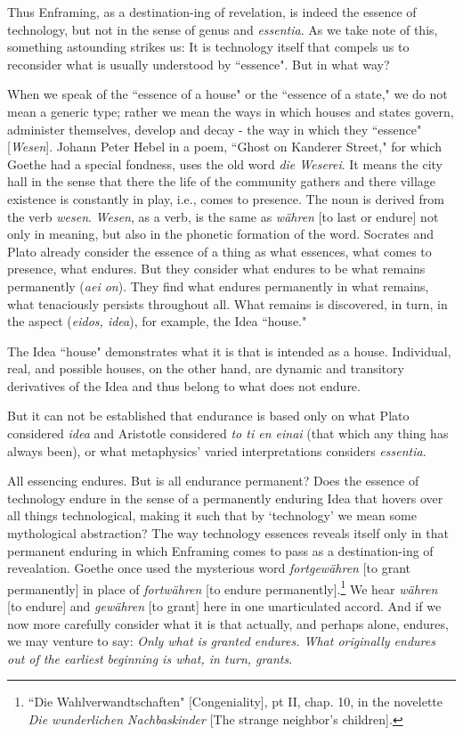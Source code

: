 \documentclass[paper=a4, fontsize=11pt,twoside]{scrartcl}
\begin{document}
Thus Enframing, as a destination-ing of revelation, is indeed the essence of technology, but not in the sense of genus and \textit{essentia}. As we take note of this, something astounding strikes us: It is technology itself that compels us to reconsider what is usually understood by ``essence". But in what way?

When we speak of the ``essence of a house" or the ``essence of a state," we do not mean a generic type; rather we mean the ways in which houses and states govern, administer themselves, develop and decay - the way in which they ``essence" [\textit{Wesen}]. Johann Peter Hebel in a poem, ``Ghost on Kanderer Street," for which Goethe had a special fondness, uses the old word \textit{die Weserei}. It means the city hall in the sense that there the life of the community gathers and there village existence is constantly in play, i.e., comes to presence. The noun is derived from the verb \textit{wesen}. \textit{Wesen}, as a verb, is the same as \textit{w{\"a}hren} [to last or endure] not only in meaning, but also in the phonetic formation of the word. Socrates and Plato already consider the essence of a thing as what essences, what comes to presence, what endures. But they consider what endures to be what remains permanently (\textit{aei on}). They find what endures permanently in what remains, what tenaciously persists throughout all. What remains is discovered, in turn, in the aspect (\textit{eidos, idea}), for example, the Idea ``house."

The Idea ``house" demonstrates what it is that is intended as a house. Individual, real, and possible houses, on the other hand, are dynamic and transitory derivatives of the Idea and thus belong to what does not endure.

But it can not be established that endurance is based only on what Plato considered \textit{idea} and Aristotle considered \textit{to ti {\-e}n einai} (that which any thing has always been), or what metaphysics' varied interpretations considers \textit{essentia}.

All essencing endures. But is all endurance permanent? Does the essence of technology endure in the sense of a permanently enduring Idea that hovers over all things technological, making it such that by `technology' we mean some mythological abstraction? The way technology essences reveals itself only in that permanent enduring in which Enframing comes to pass as a destination-ing of revealation. Goethe once used the mysterious word \textit{fortgew{\"a}hren} [to grant permanently] in place of \textit{fortw{\"a}hren} [to endure permanently].\footnote[3]{``Die Wahlverwandtschaften" [Congeniality], pt II, chap. 10, in the novelette \textit{Die wunderlichen Nachbaskinder} [The strange neighbor's children].} We hear \textit{w{\"a}hren} [to endure] and \textit{gew{\"a}hren} [to grant] here in one unarticulated accord. And if we now more carefully consider what it is that actually, and perhaps alone, endures, we may venture to say: \textit{Only what is granted endures. What originally endures out of the earliest beginning is what, in turn, grants}. 
\end{document}

